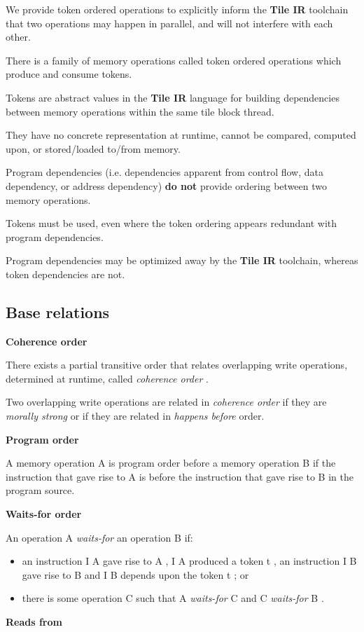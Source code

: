 \documentclass{article}
\begin{document}
We provide token ordered operations to explicitly inform the \textbf{Tile IR} toolchain that two operations may happen in parallel, and will not interfere with each other.

There is a family of memory operations called token ordered operations which produce and consume tokens.

Tokens are abstract values in the \textbf{Tile IR} language for building dependencies between memory operations within the same tile block thread.

They have no concrete representation at runtime, cannot be compared, computed upon, or stored/loaded to/from memory.


Program dependencies (i.e. dependencies apparent from control flow, data dependency, or address dependency) \textbf{do not} provide ordering between two memory operations.

Tokens must be used, even where the token ordering appears redundant with program dependencies.

Program dependencies may be optimized away by the \textbf{Tile IR} toolchain, whereas token dependencies are not.



\subsection{Base relations}

\textbf{Coherence order}


There exists a partial transitive order that relates overlapping write operations, determined at runtime, called \textit{coherence order} .

Two overlapping write operations are related in \textit{coherence order} if they are \textit{morally strong} or if they are related in \textit{happens before} order.


\textbf{Program order}


A memory operation A is program order before a memory operation B if the instruction that gave rise to A is before the instruction that gave rise to B in the program source.


\textbf{Waits-for order}


An operation A \textit{waits-for} an operation B if:

\begin{itemize}
\item an instruction I A gave rise to A , I A produced a token t , an instruction I B gave rise to B and I B depends upon the token t ; or
\item there is some operation C such that A \textit{waits-for} C and C \textit{waits-for} B .

\end{itemize}
\textbf{Reads from}
\end{document}

